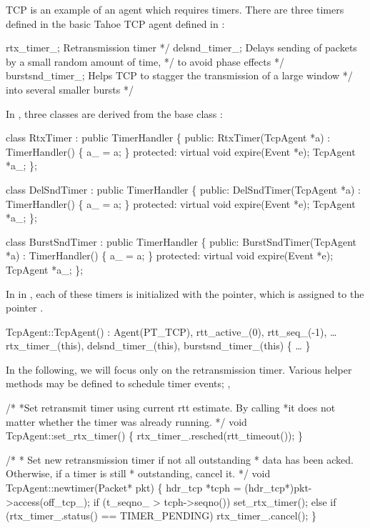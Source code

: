 TCP is an example of an agent which requires timers.  There are three timers
defined in the basic Tahoe TCP agent defined in :
\begin{program}
        rtx_timer_;      \*  Retransmission timer */
        delsnd_timer_;   \*  Delays sending of packets by a small random amount of time, */
                        \* to avoid phase effects */
        burstsnd_timer_;   \* Helps TCP to stagger the transmission of a large window */
                                \* into several smaller bursts */
\end{program}
In , three classes are derived from the base class
:
\begin{program}
        class RtxTimer : public TimerHandler \{
        public:
            RtxTimer(TcpAgent *a) : TimerHandler() \{ a_ = a; \}
        protected:                   
            virtual void expire(Event *e);
            TcpAgent *a_;
        \};  
            
        class DelSndTimer : public TimerHandler \{
        public:
            DelSndTimer(TcpAgent *a) : TimerHandler() \{ a_ = a; \}
        protected:
            virtual void expire(Event *e);
            TcpAgent *a_;
        \};      
    
        class BurstSndTimer : public TimerHandler \{
        public: 
            BurstSndTimer(TcpAgent *a) : TimerHandler() \{ a_ = a; \}
        protected:
            virtual void expire(Event *e); 
            TcpAgent *a_;
        \};  
\end{program}
In
in ,
each of these timers
is initialized with the  pointer,
which is assigned to the pointer .
\begin{program}
        TcpAgent::TcpAgent() : Agent(PT_TCP), rtt_active_(0), rtt_seq_(-1), 
            \ldots
            rtx_timer_(this), delsnd_timer_(this), burstsnd_timer_(this)
        \{
            \ldots
        \}
\end{program}
In the following, we will focus only on the retransmission timer.  Various
helper methods may be defined to schedule timer events; \eg,
\begin{program}
        /*
         *{\cf Set retransmit timer using current rtt estimate.  By calling }
         *{\cf it does not matter whether the timer was already running.}
         */
        void TcpAgent::set_rtx_timer()
        \{
            rtx_timer_.resched(rtt_timeout());
        \}

        /*
         * {\cf Set new retransmission timer if not all outstanding}
         * {\cf data has been acked.  Otherwise, if a timer is still}
         * {\cf outstanding, cancel it.}
         */
        void TcpAgent::newtimer(Packet* pkt)
        \{
            hdr_tcp *tcph = (hdr_tcp*)pkt->access(off_tcp_);
            if (t_seqno_ > tcph->seqno())
                set_rtx_timer();
            else if (rtx_timer_.status() == TIMER_PENDING)
                rtx_timer_.cancel();
        \}
\end{program}
